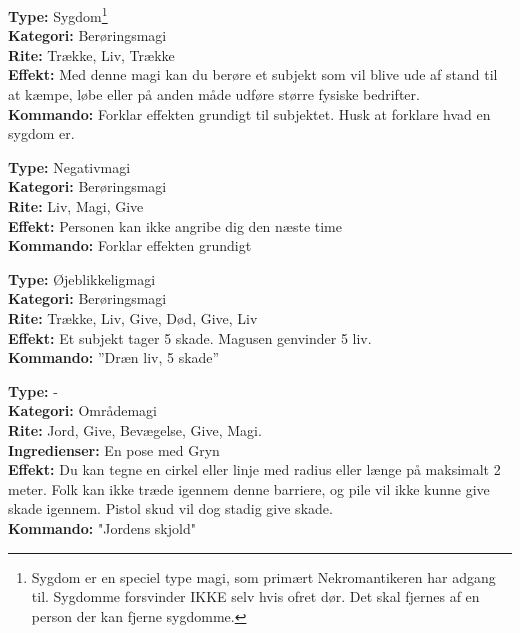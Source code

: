 \begin{lærmagi*}[Spedalsk]
\textbf{Type:} Sygdom\footnote{Sygdom er en speciel type magi, som primært Nekromantikeren har adgang til. Sygdomme forsvinder IKKE selv hvis ofret dør. Det skal fjernes af en person der kan fjerne sygdomme.}\\
\textbf{Kategori:} Berøringsmagi\\
\textbf{Rite:} Trække, Liv, Trække\\
\textbf{Effekt:} Med denne magi kan du berøre et subjekt som vil blive ude af stand til at kæmpe, løbe eller på anden måde udføre større fysiske bedrifter.\\
\textbf{Kommando:} Forklar effekten grundigt til subjektet. Husk at forklare hvad en sygdom er.\\
\end{lærmagi*}

\begin{lærmagi*}[Fred]
\textbf{Type:} Negativmagi\\
\textbf{Kategori:} Berøringsmagi\\
\textbf{Rite:} Liv, Magi, Give\\
\textbf{Effekt:} Personen kan ikke angribe dig den næste time\\
\textbf{Kommando:} Forklar effekten grundigt\\
\end{lærmagi*}

\begin{lærmagi*}
\textbf{Type:} Øjeblikkeligmagi\\
\textbf{Kategori:} Berøringsmagi\\
\textbf{Rite:} Trække, Liv, Give, Død, Give, Liv\\
\textbf{Effekt:} Et subjekt tager 5 skade. Magusen genvinder 5 liv.\\
\textbf{Kommando:} ”Dræn liv, 5 skade”\\
\end{lærmagi*}

\begin{lærmagi*}
\textbf{Type:} -\\
\textbf{Kategori:} Områdemagi\\
\textbf{Rite:} Jord, Give, Bevægelse, Give, Magi.\\
\textbf{Ingredienser:} En pose med Gryn\\
\textbf{Effekt:} Du kan tegne en cirkel eller linje med radius eller længe på maksimalt 2 meter. Folk kan ikke træde igennem denne barriere, og pile vil ikke kunne give skade igennem. Pistol skud vil dog stadig give skade.\\
\textbf{Kommando:} "Jordens skjold"\\
\end{lærmagi*}

